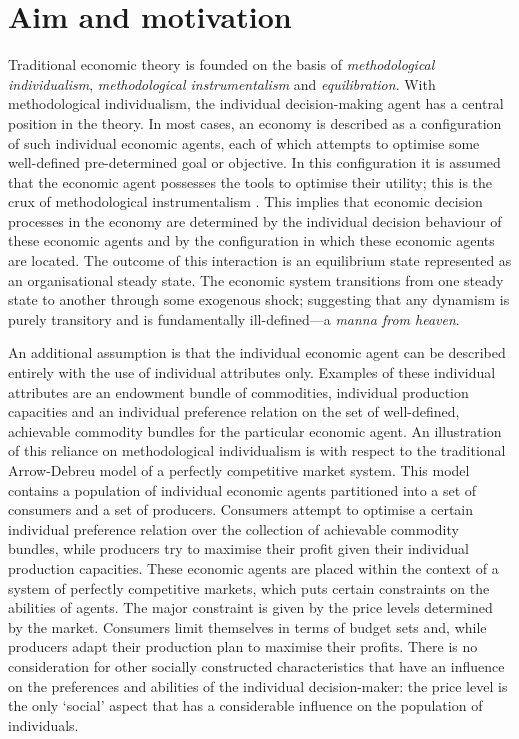 \section{Aim and motivation}
\label{sec:aimMotivation}

Traditional economic theory is founded on the basis of \emph{methodological individualism}, \emph{methodological instrumentalism} and \emph{equilibration}. With methodological individualism, the individual decision-making agent has a central position in the theory. In most cases, an economy is described as a configuration of such individual economic agents, each of which attempts to optimise some well-defined pre-determined goal or objective. In this configuration it is assumed that the economic agent possesses the tools to optimise their utility; this is the crux of methodological instrumentalism \citep{Arnsperger2006}. This implies that economic decision processes in the economy are determined by the individual decision behaviour of these economic agents and by the configuration in which these economic agents are located. The outcome of this interaction is an equilibrium state represented as an organisational steady state. The economic system transitions from one steady state to another through some exogenous shock; suggesting that any dynamism is purely transitory and is fundamentally ill-defined---a \emph{manna from heaven}.

An additional assumption is that the individual economic agent can be described entirely with the use of individual attributes only. Examples of these individual attributes are an endowment bundle of commodities, individual production capacities and an individual preference relation on the set of well-defined, achievable commodity bundles for the particular economic agent. An illustration of this reliance on methodological individualism is with respect to the traditional Arrow-Debreu model of a perfectly competitive market system. This model contains a population of individual economic agents partitioned into a set of consumers and a set of producers. Consumers attempt to optimise a certain individual preference relation over the collection of achievable commodity bundles, while producers try to maximise their profit given their individual production capacities. These economic agents are placed within the context of a system of perfectly competitive markets, which puts certain constraints on the abilities of agents. The major constraint is given by the price levels determined by the market. Consumers limit themselves in terms of budget sets and, while producers adapt their production plan to maximise their profits. There is no consideration for other socially constructed characteristics that have an influence on the preferences and abilities of the individual decision-maker: the price level is the only `social' aspect that has a considerable influence on the population of individuals.


